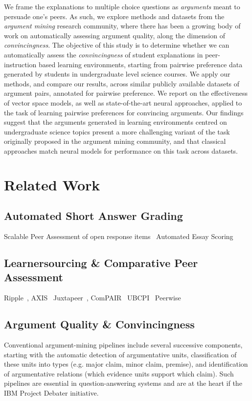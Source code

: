 \documentclass[runningheads]{llncs}
\begin{document}
We frame the explanations to multiple choice questions as \textit{arguments} 
meant to persuade one's peers. As such, we explore methods and datasets from 
the \textit{argument mining} research community, where there has been a growing 
body of work on automatically assessing argument quality, along the dimension 
of \textit{convincingness}.
The objective of this study is to determine whether we can automatically assess 
the \textit{convincingness} of student explanations in peer-instruction based 
learning environments, starting from pairwise preference data generated by 
students in undergraduate level science courses. We apply our methods, and 
compare our results, across similar publicly available datasets of argument 
pairs, annotated for pairwise preference. We report on the effectiveness of 
vector space models, as well as state-of-the-art neural approaches, applied to 
the task of learning pairwise preferences for convincing arguments. Our 
findings suggest that the arguments generated in learning environments centred 
on undergraduate science topics present a more challenging variant of the task 
originally proposed in the argument mining community, and that classical 
approaches match neural models for performance on this task across datasets.

\section{Related Work}

\subsection{Automated Short Answer Grading}
Scalable Peer Assessment of open response items~\cite{piech_tuned_2013}
Automated Essay Scoring~\cite{shermis_automated_2003}


\subsection{Learnersourcing \& Comparative Peer Assessment}
Ripple~\cite{khosravi_ripple_2019}, 
AXIS~\cite{williams_axis:_2016}
Juxtapeer~\cite{cambre_juxtapeer:_2018}, 
ComPAIR~\cite{potter_compair:_2017}
UBCPI~\cite{univeristy_of_british_columbia_ubc/ubcpi_2019}
Peerwise~\cite{denny_peerwise:_2008}

\subsection{Argument Quality \& Convincingness}
Conventional argument-mining pipelines include several successive components, 
starting with the automatic detection of argumentative units, classification of 
these units into types (e.g. major claim, minor claim, premise), and 
identification of argumentative relations (which evidence units support which 
claim). 
Such pipelines are essential in question-answering systems 
\cite{lippi_argumentation_2016} and are at the heart if the IBM Project Debater 
initiative. 
\end{document}
